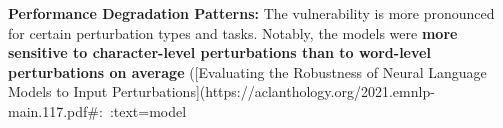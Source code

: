 \textbf{Performance Degradation Patterns:} The vulnerability is more pronounced for certain perturbation types and tasks. Notably, the models were \textbf{more sensitive to character-level perturbations than to word-level perturbations on average} ([Evaluating the Robustness of Neural Language Models to Input Perturbations](https://aclanthology.org/2021.emnlp-main.117.pdf#:~:text=model%

